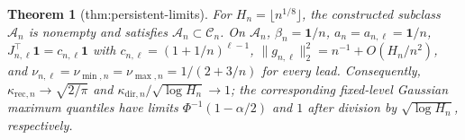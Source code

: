 \documentclass{article}
\newtheorem{theorem}{Theorem}
\begin{document}
\begin{theorem}[thm:persistent-limits]\label{thm:persistent-limits}
For \(H_n=\lfloor n^{1/8}\rfloor\), the constructed subclass \(\mathcal A_n\) is nonempty and satisfies \(\mathcal A_n\subset\mathcal C_n\). On \(\mathcal A_n\), \(\beta_n=\boldsymbol 1/n\), \(a_n=a_{n,\ell}=\boldsymbol 1/n\), \(J_{n,\ell}^{\top}\boldsymbol 1=c_{n,\ell}\boldsymbol 1\) with \(c_{n,\ell}=(1+1/n)^{\ell-1}\), \(\|g_{n,\ell}\|_2^2=n^{-1}+O(H_n/n^2)\), and \(\nu_{n,\ell}=\nu_{\min,n}=\nu_{\max,n}=1/(2+3/n)\) for every lead. Consequently, \(\kappa_{\mathrm{rec},n}\to\sqrt{2/\pi}\) and \(\kappa_{\mathrm{dir},n}/\sqrt{\log H_n}\to1\); the corresponding fixed-level Gaussian maximum quantiles have limits \(\Phi^{-1}(1-\alpha/2)\) and \(1\) after division by \(\sqrt{\log H_n}\), respectively.
\end{theorem}
\end{document}
